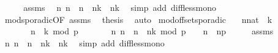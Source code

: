 \begin{isabellebody}
%
\isadelimproof
%
\endisadelimproof
%
\isatagproof
{}\isamarkupfalse%
\ {\isacharminus}\isanewline
\ \ \isamarkupfalse%
\ assms\ \isamarkupfalse%
\ {\isacartoucheopen}{\isasymforall}n{\isacharprime}{\isachardot}\ n{\isacharprime}\ {\isachargreater}\ n\ {\isasymlongrightarrow}\ {\isacharparenleft}n{\isacharprime}{\isacharminus}k{\isacharparenright}\ {\isachargreater}\ {\isacharparenleft}n{\isacharminus}k{\isacharparenright}{\isacartoucheclose}\ \isamarkupfalse%
\ {\isacharparenleft}simp\ add{\isacharcolon}\ diff{\isacharunderscore}less{\isacharunderscore}mono{\isacharparenright}\isanewline
\ \ \isamarkupfalse%
\ mod{\isacharunderscore}sporadic{\isacharbrackleft}OF\ assms{\isacharparenleft}{}{\isacharparenright}{\isacharbrackright}\ \isamarkupfalse%
\ {\isacharquery}thesis\ \isamarkupfalse%
\ auto\isanewline
{}\isamarkupfalse%
%
\endisatagproof
{\isafoldproof}%
%
\isadelimproof
\isanewline
%
\endisadelimproof
\isanewline
{}\isamarkupfalse%
\ mod{\isacharunderscore}offset{\isacharunderscore}sporadic{\isacharprime}{\isacharcolon}\isanewline
\ \ \ {\isacartoucheopen}{\isacharparenleft}n{\isacharcolon}{\isacharcolon}nat{\isacharparenright}\ {\isasymge}\ k{\isacartoucheclose}\isanewline
\ \ \ \ \ \ \ {\isacartoucheopen}{\isacharparenleft}n\ {\isacharminus}\ k{\isacharparenright}\ mod\ p\ {\isacharequal}\ {}{\isacartoucheclose}\isanewline
\ \ \ \ \ {\isacartoucheopen}{\isasymforall}n{\isacharprime}{\isachardot}\ {\isacharparenleft}n\ {\isacharless}\ n{\isacharprime}\ {\isasymand}\ {\isacharparenleft}{\isacharparenleft}n{\isacharprime}{\isacharminus}k{\isacharparenright}\ mod\ p\ {\isacharequal}\ {}{\isacharparenright}{\isacharparenright}\ {\isasymlongrightarrow}\ n{\isacharprime}\ {\isasymge}\ n{\isacharplus}p{\isacartoucheclose}\isanewline
%
\isadelimproof
%
\endisadelimproof
%
\isatagproof
{}\isamarkupfalse%
\ {\isacharminus}\isanewline
\ \ \isamarkupfalse%
\ assms\ \isamarkupfalse%
\ {\isacartoucheopen}{\isasymforall}n{\isacharprime}{\isachardot}\ n{\isacharprime}\ {\isachargreater}\ n\ {\isasymlongrightarrow}\ {\isacharparenleft}n{\isacharprime}{\isacharminus}k{\isacharparenright}\ {\isachargreater}\ {\isacharparenleft}n{\isacharminus}k{\isacharparenright}{\isacartoucheclose}\ \isamarkupfalse%
\ {\isacharparenleft}simp\ add{\isacharcolon}\ diff{\isacharunderscore}less{\isacharunderscore}mono{\isacharparenright}\isanewline

\end{isabellebody}
